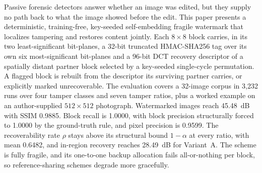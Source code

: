 Passive forensic detectors answer whether an image was edited, but they supply no path back to what the image showed before the edit. This paper presents a deterministic, training-free, key-seeded self-embedding fragile watermark that localizes tampering and restores content jointly. Each $8{\times}8$ block carries, in its two least-significant bit-planes, a 32-bit truncated HMAC-SHA256 tag over its own six most-significant bit-planes and a 96-bit DCT recovery descriptor of a spatially distant partner block selected by a key-seeded single-cycle permutation. A flagged block is rebuilt from the descriptor its surviving partner carries, or explicitly marked unrecoverable. The evaluation covers a 32-image corpus in 3,232 runs over four tamper classes and seven tamper ratios, plus a worked example on an author-supplied $512{\times}512$ photograph. Watermarked images reach 45.48~dB with SSIM 0.9885. Block recall is 1.0000, with block precision structurally forced to 1.0000 by the ground-truth rule, and pixel precision is 0.9599. The recoverability rate $\rho$ stays above its structural bound $1-\alpha$ at every ratio, with mean 0.6482, and in-region recovery reaches 28.49~dB for Variant~A. The scheme is fully fragile, and its one-to-one backup allocation fails all-or-nothing per block, so reference-sharing schemes degrade more gracefully.
